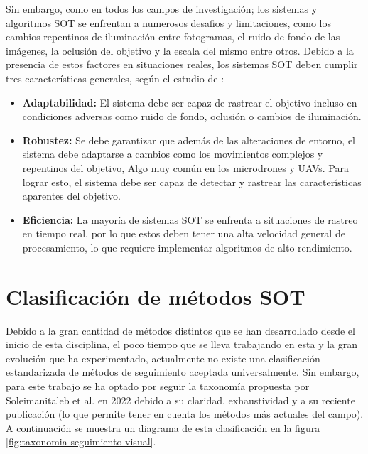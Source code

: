     Sin embargo, como en todos los campos de investigación; los sistemas y algoritmos SOT se enfrentan a numerosos desafios y limitaciones, como los cambios repentinos de iluminación entre fotogramas, el ruido de fondo de las imágenes, la oclusión del objetivo y la escala del mismo entre otros. Debido a la presencia de estos factores en situaciones reales, los sistemas SOT deben cumplir tres características generales, según el estudio de \cite{Articulo_Concepto_SOT}: 
    \begin{itemize}
        \item \textbf{Adaptabilidad:} El sistema debe ser capaz de rastrear el objetivo incluso en condiciones adversas como ruido de fondo, oclusión o cambios de iluminación.
        \item \textbf{Robustez:} Se debe garantizar que además de las alteraciones de entorno, el sistema debe adaptarse a cambios como los movimientos complejos y repentinos del objetivo, Algo muy común en los microdrones y UAVs. Para lograr esto, el sistema debe ser capaz de detectar y rastrear las características aparentes del objetivo.
        \item \textbf{Eficiencia:} La mayoría de sistemas SOT se enfrenta a situaciones de rastreo en tiempo real, por lo que estos deben tener una alta velocidad general de procesamiento, lo que requiere implementar algoritmos de alto rendimiento.
    \end{itemize}

    \section{Clasificación de métodos SOT}

    Debido a la gran cantidad de métodos distintos que se han desarrollado desde el inicio de esta disciplina, el poco tiempo que se lleva trabajando en esta y la gran evolución que ha experimentado, actualmente no existe una clasificación estandarizada de métodos de seguimiento aceptada universalmente. Sin embargo, para este trabajo se ha optado por seguir la taxonomía propuesta por Soleimanitaleb et al. en 2022 debido a su claridad, exhaustividad y a su reciente publicación (lo que permite tener en cuenta los métodos más actuales del campo). A continuación se muestra un diagrama de esta clasificación en la figura \ref{fig:taxonomia-seguimiento-visual}.




